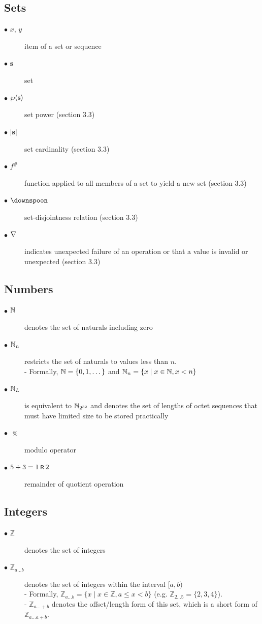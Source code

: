 \subsection{Sets}\label{sec:sets}
\begin{description}
  \item[$\bullet$ $x$, $y$] item of a set or sequence
  \item[$\bullet$ $\mathbf{s}$] set
  \item[$\bullet$ $\powset{\mathbf{s}}$] set power (section 3.3)
  \item[$\bullet$ $|\mathbf{s}|$] set cardinality (section 3.3)
  \item[$\bullet$ $f^{\#}$] function applied to all members of a set to yield a new set (section 3.3) 
  \item[$\bullet$ $\disjoint$] set-disjointness relation (section 3.3)
  \item[$\bullet$ $\nabla$] indicates unexpected failure of an operation or that a value is invalid or unexpected (section 3.3) 
\end{description}

\subsection{Numbers}\label{sec:numbers}
\begin{description}
  \item[$\bullet$ $\mathbb{N}$] denotes the set of naturals including zero
  \item[$\bullet$ $\mathbb{N}_n$] restricts the set of naturals to values less than $n$.
    \\ - Formally, $\mathbb{N} = \{0, 1, \dots \}$ and $\mathbb{N}_n = \{ x \mid x \in \mathbb{N}, x < n \}$
  \item[$\bullet$ $\mathbb{N}_L$] is equivalent to $\mathbb{N}_{2^{32}}$ and denotes the set of lengths
  of octet sequences that must have limited size to be stored practically
  \item[$\bullet$ $\ \text{\scriptsize{\%}}\ $] modulo operator
  \item[$\bullet$ $5 \div 3 = 1 \text{\hspace{2pt}\footnotesize{\textsf{R}}\hspace{2pt}} 2$] remainder of quotient operation
\end{description}

\subsection{Integers}\label{sec:integers}
\begin{description}
  \item[$\bullet$ $\mathbb{Z}$] denotes the set of integers
  \item[$\bullet$ $\mathbb{Z}_{a \dots b}$] denotes the set of integers within the interval $[a, b)$
    \\ - Formally, $\mathbb{Z}_{a \dots b} = \{ x \mid x \in \mathbb{Z}, a \le x < b \}$ (e.g. $\mathbb{Z}_{2 \dots 5} = \{ 2, 3, 4 \}$).
    \\ - $\mathbb{Z}_{a \dots +b}$ denotes the offset/length form of this set, which is a short form of $\mathbb{Z}_{a \dots a+b}$.
\end{description}


